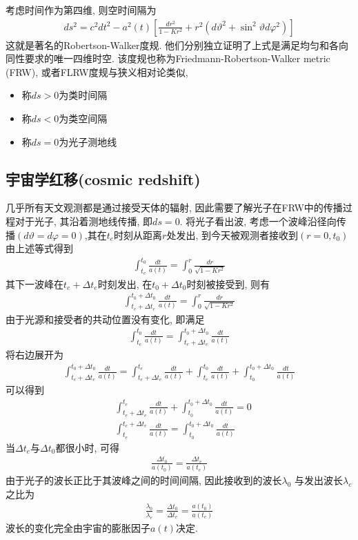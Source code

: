 考虑时间作为第四维, 则空时间隔为
\begin{align}
    ds^2=c^2 dt^2-a^2(t)\left[ \frac{dr^2}{1-Kr^2}+r^2(d\vartheta^2 + \sin^2\vartheta d \varphi^2) \right] \label{E1}
\end{align}
这就是著名的Robertson-Walker度规. 他们分别独立证明了上式是满足均匀和各向同性要求的唯一四维时空. 该度规也称为Friedmann-Robertson-Walker metric (FRW), 或者FLRW度规与狭义相对论类似, 
\begin{itemize}\small
    \item 称$ds>0$为类时间隔
    \item 称$ds<0$为类空间隔
    \item 称$ds=0$为光子测地线
\end{itemize}

\subsection{宇宙学红移(cosmic redshift)}
几乎所有天文观测都是通过接受天体的辐射, 因此需要了解光子在FRW中的传播过程对于光子, 其沿着测地线传播, 即$ds=0$. 将光子看出波, 考虑一个波峰沿径向传播$(d\vartheta= d\varphi=0)$,其在$t_e$时刻从距离$r$处发出, 到今天被观测者接收到$(r=0, t_0)$由上述等式得到
\begin{align*}
    \int_{t_e}^{t_0}\frac{dt}{a(t)}=\int_0^r\frac{dr}{\sqrt{1-Kr^2}}
\end{align*}
其下一波峰在$t_e+\Delta t_e$时刻发出, 在$t_0 + \Delta t_0$时刻被接受到, 则有
\begin{align*}
    \int_{t_e+\Delta t_e}^{t_0+\Delta t_0}\frac{dt}{a(t)}=\int_0^r\frac{dr}{\sqrt{1-Kr^2}}
\end{align*}
由于光源和接受者的共动位置没有变化, 即满足
\begin{align*}
    \int_{t_e}^{t_0}\frac{dt}{a(t)}=\int_{t_e+\Delta t_e}^{t_0+\Delta t_0}\frac{dt}{a(t)}
\end{align*}
将右边展开为
\begin{align*}
    \int_{t_e+\Delta t_e}^{t_0+\Delta t_0}\frac{dt}{a(t)}=\int_{t_e+\Delta t_e}^{t_e}\frac{dt}{a(t)}+\int_{t_e}^{t_0}\frac{dt}{a(t)}+\int_{t_0}^{t_0+\Delta t_0}\frac{dt}{a(t)}
\end{align*}
可以得到
\begin{align*}
    &\int_{t_e+\Delta t_e}^{t_e}\frac{dt}{a(t)}+\int_{t_0}^{t_0+\Delta t_0}\frac{dt}{a(t)}=0\\
    &\int_{t_e}^{t_e+\Delta t_e}\frac{dt}{a(t)}=\int_{t_0}^{t_0+\Delta t_0}\frac{dt}{a(t)}
\end{align*}
当$\Delta t_e$与$\Delta t_0$都很小时, 可得
\begin{align*}
    \frac{\Delta t_0}{a(t_0)}=\frac{\Delta t_e}{a(t_e)}
\end{align*}
由于光子的波长正比于其波峰之间的时间间隔, 因此接收到的波长$\lambda_0$ 与发出波长$\lambda_e$ 之比为
\begin{align*}
    \frac{\lambda_0}{\lambda_e}=\frac{\Delta t_0}{\Delta t_e}=\frac{a(t_0)}{a(t_e)}
\end{align*}
波长的变化完全由宇宙的膨胀因子$a(t)$决定. 


